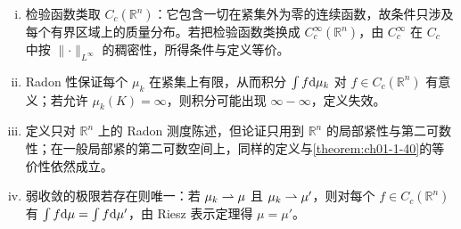 \documentclass[../../main.tex]{subfiles}%
\begin{document}
\begin{remark}\label{remark:ch01-def-1-31-条件}
\begin{enumerate}[(i)]
\item 检验函数类取 $C_c(\mathbb{R}^n)$：它包含一切在紧集外为零的连续函数，故条件只涉及每个有界区域上的质量分布。若把检验函数类换成 $C_c^\infty(\mathbb{R}^n)$，由 $C_c^\infty$ 在 $C_c$ 中按 $\lVert\cdot\rVert_{L^\infty}$ 的稠密性，所得条件与定义等价。
\item Radon 性保证每个 $\mu_k$ 在紧集上有限，从而积分 $\int f\mathrm{d}\mu_k$ 对 $f\in C_c(\mathbb{R}^n)$ 有意义；若允许 $\mu_k(K)=\infty$，则积分可能出现 $\infty-\infty$，定义失效。
\item 定义只对 $\mathbb{R}^n$ 上的 Radon 测度陈述，但论证只用到 $\mathbb{R}^n$ 的局部紧性与第二可数性；在一般局部紧的第二可数空间上，同样的定义与\cref{theorem:ch01-1-40}的等价性依然成立。%
\item 弱收敛的极限若存在则唯一：若 $\mu_k\rightharpoonup\mu$ 且 $\mu_k\rightharpoonup\mu'$，则对每个 $f\in C_c(\mathbb{R}^n)$ 有 $\int f\mathrm{d}\mu=\int f\mathrm{d}\mu'$，由 Riesz 表示定理得 $\mu=\mu'$。
\end{enumerate}
\end{remark}
\end{document}
